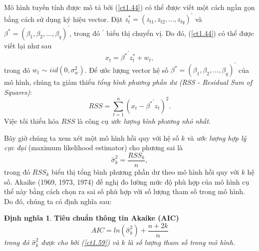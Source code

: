 \documentclass[12pt, a4paper,oneside]{book}
\theoremstyle{definition}
\newtheorem{dn}[theo]{Định nghĩa}
\begin{document}
Mô hình tuyến tính được mô tả bởi (\ref{ct1.44}) có thể được viết một cách ngắn gọn bằng cách sử dụng ký hiệu vector. Đặt $z^{*}_{t}=(z_{t1}, z_{t2}, \dots, z_{tq})^{'}$ và $\beta^{*}=(\beta_{1}, \beta_{2}, \dots, \beta_{q})^{'}$, trong đó $^{'}$ biểu thị chuyển vị. Do đó, (\ref{ct1.44}) có thể được viết lại như sau
\begin{equation}
x_{t}={\beta^{*}}^{'}z^{*}_{t} + w_{t}, \label{ct1.45}
\end{equation}	
trong đó $w_{t}$ $\sim$ $iid(0, \sigma_{w}^{2})$. Để ước lượng  vector hệ số $\beta^{*}=(\beta_{1}, \beta_{2}, \dots, \beta_{q})^{'}$ của mô hình, chúng ta giảm thiểu \textit{tổng bình phương phần dư (RSS - Residual Sum of Squares)}:
\begin{equation}
RSS = \sum_{t=1}^{n}(x_{t}- {\beta^{*}}^{'}z_{t})^{2}. \label{ct1.46}	
\end{equation}
Việc tối thiểu hóa $RSS$ là công cụ\textit{ ước lượng bình phương nhỏ nhất}.

Bây giờ chúng ta xem xét một mô hình hồi quy với hệ số $ k $ và \textit{ước lượng hợp lý cực đại} (maximum likelihood estimator) cho phương sai  là
\begin{equation}
\widehat{\sigma}_{k}^{2}=\dfrac{RSS_{k}}{n}, \label{ct1.59}
\end{equation}
trong đó $ RSS_{k} $ biểu thị tổng bình phương phần dư theo mô hình hồi quy với $ k $ hệ số. Akaike (1969, 1973, 1974) đề nghị đo lường mức độ phù hợp của mô hình cụ thể này bằng cách chọn ra sai số phù hợp với số lượng tham số trong mô hình. Do đó, chúng ta có định nghĩa sau: 
\begin{dn}\cite{8} \textbf{Tiêu chuẩn thông tin Akaike (AIC)}\textit{ 
		\begin{equation}
		AIC= ln (\widehat{\sigma}_{k}^{2}) +\dfrac{n+ 2k}{n} \label{ct1.60}
		\end{equation}
		trong đó $\widehat{\sigma}_{k}^{2} $ được cho bởi (\ref{ct1.59}) và $ k $ là số lượng tham số trong mô hình.}
\end{dn}
\end{document}
